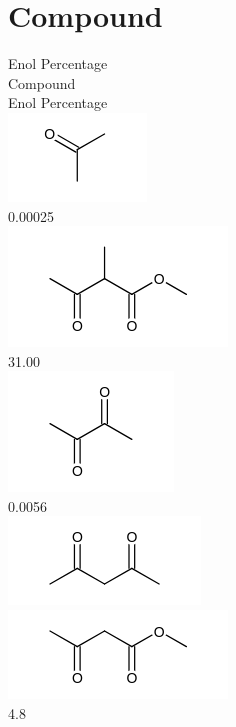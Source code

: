 \documentclass[10pt]{article}
\begin{document}
\section*{Compound}
Enol Percentage\\
Compound\\
Enol Percentage\\
\includegraphics{smile-675e730a3c5d1b61b3be6f714d2e28d81851e7ce}\\
0.00025\\
\includegraphics{smile-06777ba12a248f917a3db7c3d8ecfc64111a9dd5}\\
31.00\\
\includegraphics{smile-64f17505e465dd874e118021eb1fcff1271bfb07}\\
0.0056\\
\includegraphics{smile-55dd55aed913de729aec731fe9dd639fd384408e}\\
\includegraphics{smile-6ea17a606bcee26fed8d0dc3f34fe6c208549f6f}\\
4.8\\
\end{document}
